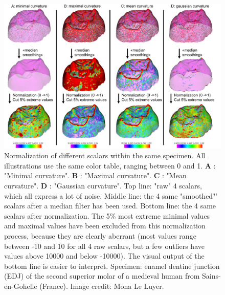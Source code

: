 \begin{figure}
  \centering
  \includegraphics[scale=0.26]{images/11/normalization_example.jpg} 
	\caption{ 
Normalization of different scalars within the same specimen. All illustrations use the same color table, ranging between 0 and 1.  \textbf{A} : "Minimal curvature".  \textbf{B} : "Maximal curvature". \textbf{C} : "Mean curvature". \textbf{D} : "Gaussian curvature". Top line: "raw" 4 scalars, which all express a lot of noise. Middle line: the 4 same "smoothed"' scalars after a median filter has been used. Bottom line: the 4 same scalars after normalization. The 5\% most extreme minimal values and maximal values have been excluded from this normalization process, because they are clearly aberrant (most values range between -10 and 10 for all 4 raw scalars, but a few outliers have values above 10000 and below -10000). The visual output of the bottom line is easier to interpret. Specimen: enamel dentine junction (EDJ) of the second superior molar of a medieval human from Sains-en-Gohelle (France). Image credit: Mona Le Luyer.	
	}
\label{normalization_example}
\end{figure}

